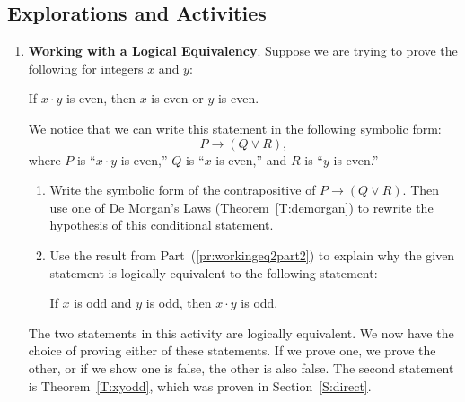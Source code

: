 \subsection*{Explorations and Activities}
\setcounter{oldenumi}{\theenumi}
\begin{enumerate} \setcounter{enumi}{\theoldenumi}
  \item \textbf{Working with a Logical Equivalency}.  \label{A:workingeq} 
Suppose we are trying to prove the following for integers  $x$  and  $y$:

\begin{center}
If  $x \cdot y$ is even, then  $x$  is  even  or  $y$  is even.
\end{center}

\noindent
We notice that we can write this statement in the following symbolic form:
\[
P \to \left( {Q \vee R} \right),
\]
where $P$ is ``$x \cdot y$ is even,'' $Q$ is ``$x$ is even,'' and $R$ is ``$y$ is even.''

\begin{enumerate}
\item Write the symbolic form of the contrapositive of  $P \to \left( {Q \vee R} \right)$.  Then use one of De Morgan's Laws (Theorem~\ref{T:demorgan}) to rewrite the hypothesis of this conditional statement. \label{pr:workingeq2part2}
%
\item Use the result from Part~(\ref{pr:workingeq2part2}) to explain why the given statement is logically equivalent to the following statement:
  \begin{center}
    If  $x$  is  odd and  $y$  is odd, then  $x \cdot y$ is odd.
  \end{center}
\end{enumerate}

The two statements in this activity are logically equivalent.  We now have the choice of proving either of these statements.  If we prove one, we prove the other, or if we show one is false, the other is also false.  The second statement is Theorem~\ref{T:xyodd}, which was proven in Section~\ref{S:direct}.
\end{enumerate}
\hbreak
%

\endinput

